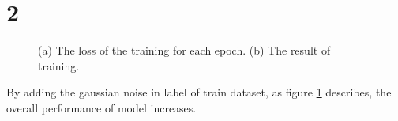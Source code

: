 \documentclass[10pt]{article}
\begin{document}
\section*{2}
\begin{figure}[!h]
    \begin{center}
    \end{center}
    \caption{(a) The loss of the training for each epoch. (b) The result of training.}
    \label{fig2}
\end{figure}
By adding the gaussian noise in label of train dataset, as figure \ref{fig2} describes, the overall performance of model increases.
\end{document}
